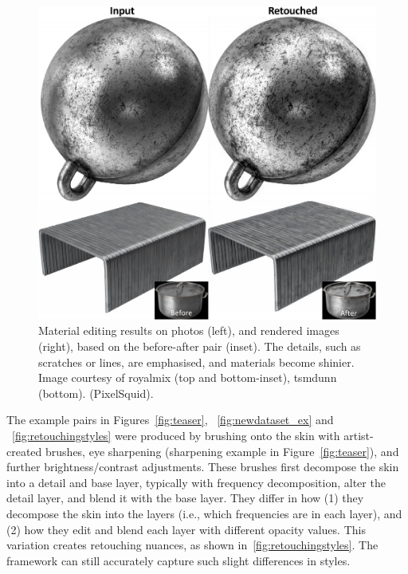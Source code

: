 \begin{figure}[th] %
	\centering
	\includegraphics[width=0.8\columnwidth]{Chapters/detail-retouching-figs/MaterialResults.pdf}
    \caption{\label{fig:material_res}Material editing results on photos (left), and rendered images (right), based on the before-after pair (inset). The details, such as scratches or lines, are emphasised, and materials become shinier. Image courtesy of royalmix (top and bottom-inset), tsmdunn (bottom). (PixelSquid).}

\end{figure}

The example pairs in Figures~\ref{fig:teaser}, ~\ref{fig:newdataset_ex}  and ~\ref{fig:retouchingstyles} were produced by brushing onto the skin with artist-created brushes, eye sharpening (sharpening example in Figure~\ref{fig:teaser}), and further brightness/contrast adjustments. These brushes first decompose the skin into a detail and base layer, typically with frequency decomposition, alter the detail layer, and blend it with the base layer. They differ in how (1) they decompose the skin into the layers (i.e., which frequencies are in each layer), and (2) how they edit and blend each layer with different opacity values. This variation creates retouching nuances, as shown in~\ref{fig:retouchingstyles}. The framework can still accurately capture such slight differences in styles. 


